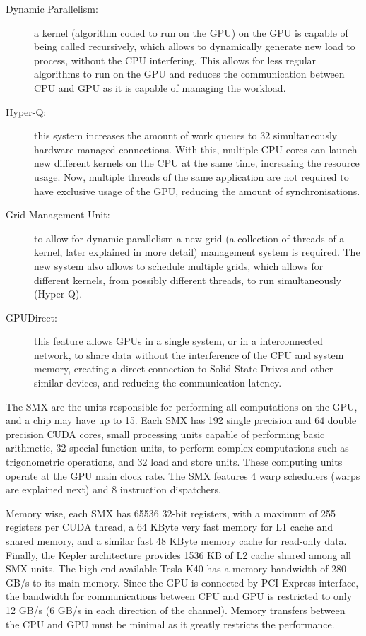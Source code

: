 \begin{description}
	\item[Dynamic Parallelism:] a kernel (algorithm coded to run on the GPU) on the GPU is capable of being called recursively, which allows to dynamically generate new load to process, without the CPU interfering. This allows for less regular algorithms to run on the GPU and reduces the communication between CPU and GPU as it is capable of managing the workload.
	\item[Hyper-Q:] this system increases the amount of work queues to 32 simultaneously hardware managed connections. With this, multiple CPU cores can launch new different kernels on the CPU at the same time, increasing the resource usage. Now, multiple threads of the same application are not required to have exclusive usage of the GPU, reducing the amount of synchronisations.
	\item[Grid Management Unit:] to allow for dynamic parallelism a new grid (a collection of threads of a kernel, later explained in more detail) management system is required. The new system also allows to schedule multiple grids, which allows for different kernels, from possibly different threads, to run simultaneously (Hyper-Q).
	\item[\nvidia GPUDirect:] this feature allows GPUs in a single system, or in a interconnected network, to share data without the interference of the CPU and system memory, creating a direct connection to Solid State Drives and other similar devices, and reducing the communication latency.
\end{description}

The SMX are the units responsible for performing all computations on the GPU, and a chip may have up to 15. Each SMX has 192 single precision and 64 double precision CUDA cores, small processing units capable of performing basic arithmetic, 32 special function units, to perform complex computations such as trigonometric operations, and 32 load and store units. These computing units operate at the GPU main clock rate. The SMX features 4 warp schedulers (warps are explained next) and 8 instruction dispatchers.

Memory wise, each SMX has 65536 32-bit registers, with a maximum of 255 registers per CUDA thread, a 64 KByte very fast memory for L1 cache and shared memory, and a similar fast 48 KByte memory cache for read-only data. Finally, the Kepler architecture provides 1536 KB of L2 cache shared among all SMX units. The high end available Tesla K40 has a memory bandwidth of 280 GB/s to its main memory. Since the GPU is connected by PCI-Express interface, the bandwidth for communications between CPU and GPU is restricted to only 12 GB/s (6 GB/s in each direction of the channel). Memory transfers between the CPU and GPU must be minimal as it greatly restricts the performance.

